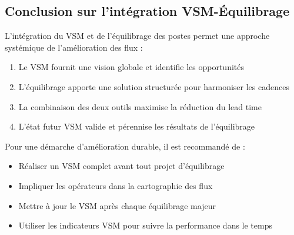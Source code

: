 \documentclass[12pt,a4paper]{article}
\newenvironment{importantnote}
  {\begin{tcolorbox}[colback=blue!5!white, colframe=blue!50!black, title=\textbf{Point Important}]\small}
  {\end{tcolorbox}}
\newenvironment{conseil}
  {\begin{tcolorbox}[colback=green!5!white, colframe=green!50!black, title=\textbf{Conseil}]\small}
  {\end{tcolorbox}}
\begin{document}
\begin{center}
\end{center}

\subsection{Conclusion sur l'intégration VSM-Équilibrage}

\begin{importantnote}
L'intégration du VSM et de l'équilibrage des postes permet une approche systémique de l'amélioration des flux :
\begin{enumerate}
    \item Le VSM fournit une vision globale et identifie les opportunités
    \item L'équilibrage apporte une solution structurée pour harmoniser les cadences
    \item La combinaison des deux outils maximise la réduction du lead time
    \item L'état futur VSM valide et pérennise les résultats de l'équilibrage
\end{enumerate}
\end{importantnote}

\begin{conseil}
Pour une démarche d'amélioration durable, il est recommandé de :
\begin{itemize}
    \item Réaliser un VSM complet avant tout projet d'équilibrage
    \item Impliquer les opérateurs dans la cartographie des flux
    \item Mettre à jour le VSM après chaque équilibrage majeur
    \item Utiliser les indicateurs VSM pour suivre la performance dans le temps
\end{itemize}
\end{conseil}
\newpage
\end{document}
